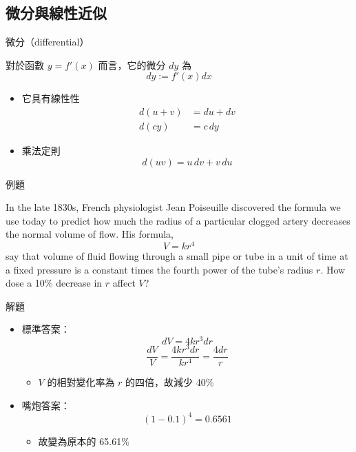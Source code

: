 \documentclass{beamer}
\begin{document}
\begin{CJK}{UTF8}{bsmi}
\subsection{微分與線性近似}
\begin{frame}{微分（differential）}
  \begin{definition}
    對於函數 $y = f'(x)$ 而言，它的微分 $dy$ 為
    \[dy := f'(x) dx\]
  \end{definition}
  \begin{theorem}
    \begin{itemize}
      \item 它具有線性性
	\begin{align*}
	  d(u + v) &= du + dv\\
	  d(cy) &= c\,dy
	\end{align*}
      \item 乘法定則
	\[d(uv) = u\,dv + v\,du\]
    \end{itemize}
  \end{theorem}
\end{frame}

\begin{frame}{例題}
  \begin{example}
    In the late 1830s, French physiologist Jean Poiseuille discovered the formula we use today to predict how much the radius
    of a particular clogged artery decreases the normal volume of flow. His formula,
      \[V = kr^4\]
    say that volume of fluid flowing through a small pipe or tube in a unit of time at a fixed pressure is a constant times the
    fourth power of the tube’s radius $r$. How dose a 10\% decrease in $r$ affect $V$?
  \end{example}
\end{frame}

\begin{frame}{解題}
  \begin{solution}
    \begin{itemize}
      \item 標準答案：
	\[dV = 4kr^3 dr\]
	\[\frac{dV}{V} = \frac{4kr^3 dr}{kr^4} = \frac{4dr}{r}\]
	\begin{itemize}
	  \item $V$ 的相對變化率為 $r$ 的四倍，故減少 40\%
	\end{itemize}
      \item 嘴炮答案：
	\[(1 - 0.1)^4 = 0.6561\]
	\begin{itemize}
	  \item 故變為原本的 65.61\%
	\end{itemize}
    \end{itemize}
  \end{solution}
\end{frame}


\end{CJK}
\end{document}

